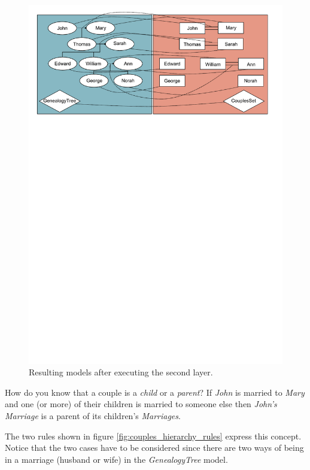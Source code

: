 \begin{figure}[h]
\begin{center}
  \includegraphics[scale=0.6, trim=0.5cm 20.4cm 1.0cm 0.6cm,
  clip]{imgs/second_layer_result.pdf}
  \caption{Resulting models after executing the second layer.}
  \label{fig:second_layer_result}
\end{center}
\end{figure}

How do you know that a couple is a \emph{child} or a \emph{parent}?
If \emph{John} is married to \emph{Mary} and one (or more) of their children is
married to someone else then \emph{John's} \emph{Marriage} is a parent of its
children's \emph{Marriages}.

The two rules shown in figure \ref{fig:couples_hierarchy_rules} express this
concept. Notice that the two cases have to be considered since there are two
ways of being in a marriage (husband or wife) in the \emph{GenealogyTree} model.

